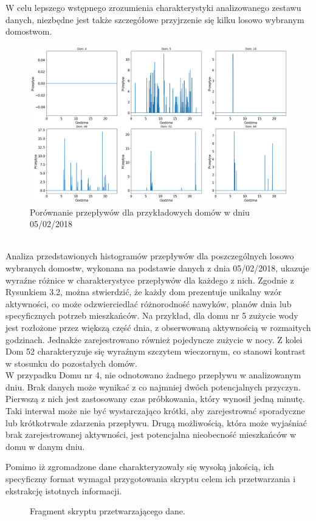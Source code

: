 \documentclass[a4paper,twoside,12pt]{book}
\begin{document}
\newpage
W celu lepszego wstępnego zrozumienia charakterystyki analizowanego zestawu danych, niezbędne jest także szczegółowe przyjrzenie się kilku losowo wybranym domostwom.\\
\begin{figure}[!h]
  \centering
  \includegraphics[width=1\textwidth]{img/Dane_nowe_compare.png}
  \caption{Porównanie przepływów dla przykładowych domów w dniu 05/02/2018}
  \label{fig:etykieta-rysunku}
\end{figure}\\
Analiza przedstawionych histogramów przepływów dla poszczególnych losowo wybranych domostw, wykonana na podstawie danych z dnia 05/02/2018, ukazuje wyraźne różnice w charakterystyce przepływów dla każdego z nich. Zgodnie z Rysunkiem 3.2, można stwierdzić, że każdy dom prezentuje unikalny wzór aktywności, co może odzwierciedlać różnorodność nawyków, planów dnia lub specyficznych potrzeb mieszkańców. Na przykład, dla domu nr 5 zużycie wody jest rozłożone przez większą część dnia, z obserwowaną aktywnością w rozmaitych godzinach. Jednakże zarejestrowano również pojedyncze zużycie w nocy. Z kolei Dom 52 charakteryzuje się wyraźnym szczytem wieczornym, co stanowi kontrast w stosunku do pozostałych domów.\\W przypadku Domu nr 4, nie odnotowano żadnego przepływu w analizowanym dniu. Brak danych może wynikać z co najmniej dwóch potencjalnych przyczyn. Pierwszą z nich jest zastosowany czas próbkowania, który wynosił jedną minutę. Taki interwał może nie być wystarczająco krótki, aby zarejestrować sporadyczne lub krótkotrwałe zdarzenia przepływu. Drugą możliwością, która może wyjaśniać brak zarejestrowanej aktywności, jest potencjalna nieobecność mieszkańców w domu w danym dniu.

\newpage
Pomimo iż zgromadzone dane charakteryzowały się wysoką jakością, ich specyficzny format wymagał przygotowania skryptu celem ich przetwarzania i ekstrakcję istotnych informacji.\\
\begin{figure}[!h]
  \centering
  
  \caption{Fragment skryptu przetwarzającego dane.}
  \label{fig:pseudokod:listings}
\end{figure}
\end{document}
